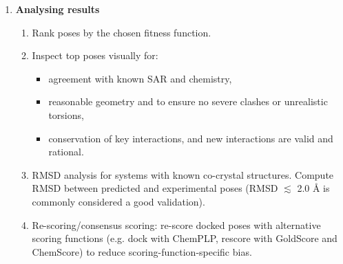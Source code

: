 \documentclass[12pt]{article}
\begin{document}
\begin{enumerate}
\item \textbf{Analysing results}
\begin{enumerate}
    \item Rank poses by the chosen fitness function.
    \item Inspect top poses visually for:
    \begin{itemize}
        \item agreement with known SAR and chemistry,
        \item reasonable geometry and to ensure no severe clashes or unrealistic torsions,
        \item conservation of key interactions, and new interactions are valid and rational.
    \end{itemize}
    \item RMSD analysis for systems with known co-crystal structures. Compute RMSD between predicted and experimental poses (RMSD $\lesssim$ 2.0 \r{A} is commonly considered a good validation)\cite{CH7_Jones1997}.
    \item Re-scoring/consensus scoring: re-score docked poses with alternative scoring functions (e.g. dock with ChemPLP, rescore with GoldScore and ChemScore) to reduce scoring-function-specific bias\cite{CH7_Verdonk2003}.
\end{enumerate}
\end{enumerate}



\end{document}
